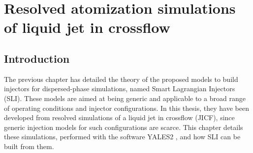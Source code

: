 \chapter{Resolved atomization simulations of liquid jet in crossflow}

\label{ch5:jicf_resolved_simulations}

%
%
%	
%	
%	
%	
%	
%	
%	
%		
%			
%			
%	
%		
%	
%		
%			
%		
%
%

\section{Introduction}

The previous chapter has detailed the theory of the proposed models to build injectors for dispersed-phase simulations, named Smart Lagrangian Injectors (SLI). These models are aimed at being generic and applicable to a broad range of operating conditions
and injector configurations. In this thesis, they have been developed from resolved simulations of a liquid jet in crossflow (JICF), since generic injection models for such configurations are scarce. This chapter details these simulations, performed with the software YALES2 , and how SLI can be built from them. %

